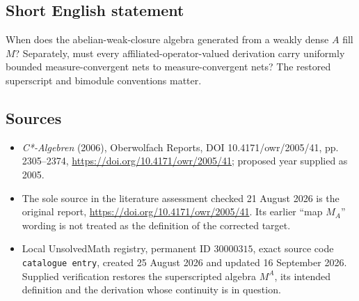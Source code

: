 \documentclass[11pt]{article}
\begin{document}
\subsection{Short English statement}
When does the abelian-weak-closure algebra generated from a weakly dense $A$ fill $M$? Separately, must every affiliated-operator-valued derivation carry uniformly bounded measure-convergent nets to measure-convergent nets? The restored superscript and bimodule conventions matter.
\subsection{Sources}
\begin{itemize}
\item \emph{C*-Algebren} (2006), Oberwolfach Reports, DOI 10.4171/owr/2005/41, pp. 2305--2374, \url{https://doi.org/10.4171/owr/2005/41}; proposed year supplied as 2005.
\item The sole source in the literature assessment checked 21 August 2026 is the original report, \url{https://doi.org/10.4171/owr/2005/41}. Its earlier ``map $M_A$'' wording is not treated as the definition of the corrected target.
\item Local UnsolvedMath registry, permanent ID $30000315$, exact source code \texttt{catalogue entry}, created 25 August 2026 and updated 16 September 2026. Supplied verification restores the superscripted algebra $M^A$, its intended definition and the derivation whose continuity is in question.
\end{itemize}
\end{document}
